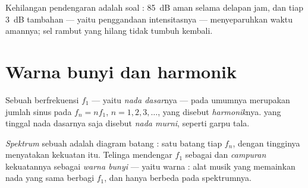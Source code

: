 \begin{remark}\label{rem:g12:sound-acoustics:damage}
Kehilangan pendengaran adalah soal : \qty{85}{dB} aman selama
delapan jam, dan tiap \qty{3}{dB} tambahan --- yaitu penggandaan
intensitasnya --- menyeparuhkan waktu amannya; sel rambut yang hilang
tidak tumbuh kembali.
\end{remark}

\section{Warna bunyi dan harmonik}

\begin{definition}[Harmonik]\label{def:g12:sound-acoustics:harmonics}
Sebuah   berfrekuensi $f_1$ --- yaitu \emph{nada
dasar}nya --- pada umumnya merupakan jumlah sinus pada
 $f_n = n f_1$, $n = 1, 2, 3, \dots$, yang disebut
\emph{harmonik}nya.  yang tinggal nada dasarnya
saja disebut \emph{nada murni}, seperti  garpu
tala.
\end{definition}

\begin{definition}\label{def:g12:sound-acoustics:timbre}
\emph{Spektrum} sebuah  adalah diagram batang
: satu batang tiap $f_n$, dengan tingginya menyatakan
kekuatan  itu. Telinga mendengar $f_1$ sebagai 
dan \emph{campuran} kekuatannya sebagai \emph{warna
bunyi} --- yaitu warna : alat musik yang
memainkan nada yang sama berbagi $f_1$, dan hanya berbeda pada
spektrumnya.
\end{definition}

